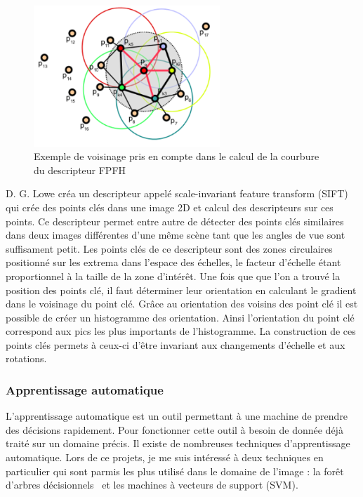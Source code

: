 \begin{figure}[!h]
  \begin{center}
    \includegraphics[width=7cm]{image/FPFH.png}
    \caption{Exemple de voisinage pris en compte dans le calcul de la courbure du descripteur FPFH}
    \label{fig:fpfhNeighborhood}
  \end{center}
\end{figure}

D. G. Lowe\cite{SIFT} créa un descripteur appelé \og scale-invariant feature transform \fg(SIFT) qui crée
des points clés dans une image 2D et calcul des descripteurs sur ces points. Ce descripteur permet entre autre
de détecter des points clés similaires dans deux images différentes d'une même scène tant que les angles de vue
sont suffisament petit. Les points clés de ce descripteur sont des zones circulaires positionné sur les extrema 
dans l'espace des échelles, le facteur d'échelle étant proportionnel à la taille de la zone d'intérêt. Une fois que
que l'on a trouvé la position des points clé, il faut déterminer leur orientation en calculant le gradient dans le voisinage
du point clé. Grâce au orientation des voisins des point clé il est possible de créer un histogramme des orientation. Ainsi
l'orientation du point clé correspond aux pics les plus importants de l'histogramme.
La construction de ces points clés permets à ceux-ci d'être invariant aux changements d'échelle et aux rotations.

\subsubsection{Apprentissage automatique}
L'apprentissage automatique est un outil permettant à une machine de prendre des décisions rapidement.
Pour fonctionner cette outil à besoin de donnée déjà traité sur un domaine précis. Il existe de nombreuses
techniques d'apprentissage automatique. Lors de ce projets, je me suis intéressé à deux techniques en 
particulier qui sont parmis les plus utilisé dans le domaine de l'image : la \og forêt d'arbres décisionnels \fg \ et les
\og machines à vecteurs de support \fg (SVM).\\

